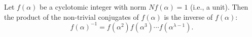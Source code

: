 Let $f(\alpha)$ be a cyclotomic integer with norm $Nf(\alpha) = 1$ (i.e., a unit). Then the product of the non-trivial conjugates of $f(\alpha)$ is the inverse of $f(\alpha)$:
$$f(\alpha)^{-1} = f(\alpha^2)f(\alpha^3)\cdots f(\alpha^{\lambda-1}).$$
